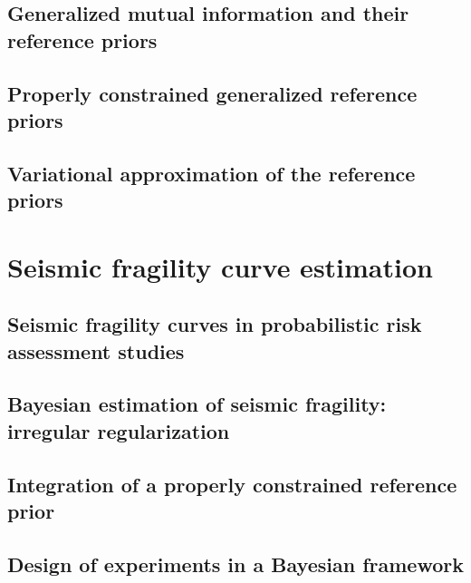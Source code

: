 \documentclass[a4paper]{book}
\begin{document}


\chapter{Generalized mutual information and their reference priors}




\chapter{Properly constrained generalized reference priors}




\chapter{Variational approximation of the reference priors}




\part{Seismic fragility curve estimation}


\chapter{Seismic fragility curves in probabilistic risk assessment studies}




\chapter{Bayesian estimation of seismic fragility: irregular regularization}




\chapter{Integration of a properly constrained reference prior}




\chapter{Design of experiments in a Bayesian framework}
\end{document}
